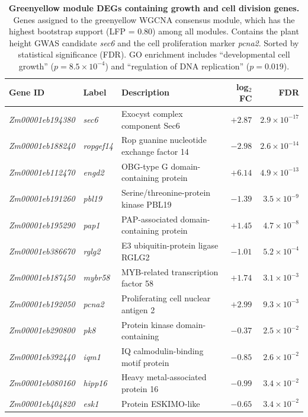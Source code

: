 \documentclass[9pt,twocolumn,twoside]{rilabRxiv}
\begin{document}
\begin{table}[!ht]
\caption{\textbf{Greenyellow module DEGs containing growth and cell division genes.} Genes assigned to the greenyellow WGCNA consensus module, which has the highest bootstrap support (LFP = 0.80) among all modules. Contains the plant height GWAS candidate \textit{sec6} and the cell proliferation marker \textit{pcna2}. Sorted by statistical significance (FDR). GO enrichment includes ``developmental cell growth'' ($p = 8.5 \times 10^{-4}$) and ``regulation of DNA replication'' ($p = 0.019$).}
\label{tab::greenyellow_module}
\centering
\small
\begin{tabular}{@{}lllrr@{}}
\toprule
\textbf{Gene ID} & \textbf{Label} & \textbf{Description} & \textbf{log$_2$FC} & \textbf{FDR} \\
\midrule
\textit{Zm00001eb194380} & \textit{sec6} & Exocyst complex component Sec6 & $+2.87$ & $2.9 \times 10^{-17}$ \\
\textit{Zm00001eb188240} & \textit{ropgef14} & Rop guanine nucleotide exchange factor 14 & $-2.98$ & $2.6 \times 10^{-14}$ \\
\textit{Zm00001eb112470} & \textit{engd2} & OBG-type G domain-containing protein & $+6.14$ & $4.9 \times 10^{-13}$ \\
\textit{Zm00001eb191260} & \textit{pbl19} & Serine/threonine-protein kinase PBL19 & $-1.39$ & $3.5 \times 10^{-9}$ \\
\textit{Zm00001eb195290} & \textit{pap1} & PAP-associated domain-containing protein & $+1.45$ & $4.7 \times 10^{-8}$ \\
\textit{Zm00001eb386670} & \textit{rglg2} & E3 ubiquitin-protein ligase RGLG2 & $-1.01$ & $5.2 \times 10^{-4}$ \\
\textit{Zm00001eb187450} & \textit{mybr58} & MYB-related transcription factor 58 & $+1.74$ & $3.1 \times 10^{-3}$ \\
\textit{Zm00001eb192050} & \textit{pcna2} & Proliferating cell nuclear antigen 2 & $+2.99$ & $9.3 \times 10^{-3}$ \\
\textit{Zm00001eb290800} & \textit{pk8} & Protein kinase domain-containing & $-0.37$ & $2.5 \times 10^{-2}$ \\
\textit{Zm00001eb392440} & \textit{iqm1} & IQ calmodulin-binding motif protein & $-0.85$ & $2.6 \times 10^{-2}$ \\
\textit{Zm00001eb080160} & \textit{hipp16} & Heavy metal-associated protein 16 & $-0.99$ & $3.4 \times 10^{-2}$ \\
\textit{Zm00001eb404820} & \textit{esk1} & Protein ESKIMO-like & $-0.65$ & $3.4 \times 10^{-2}$ \\

\end{tabular}
\end{table}
\end{document}
